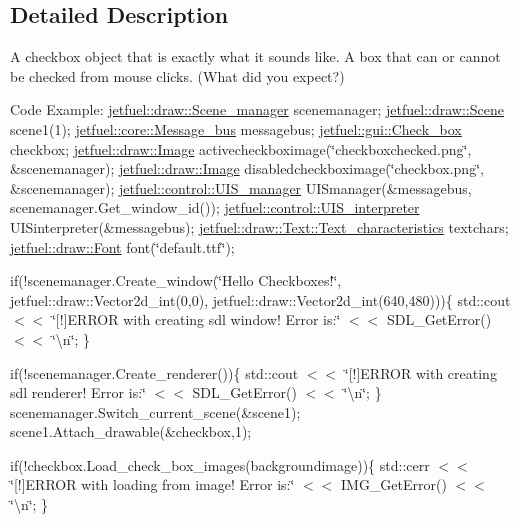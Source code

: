\subsection{Detailed Description}
A checkbox object that is exactly what it sounds like. A box that can or cannot be checked from mouse clicks. (What did you expect?)

Code Example\+: \hyperlink{classjetfuel_1_1draw_1_1Scene__manager}{jetfuel\+::draw\+::\+Scene\+\_\+manager} scenemanager; \hyperlink{classjetfuel_1_1draw_1_1Scene}{jetfuel\+::draw\+::\+Scene} scene1(1); \hyperlink{classjetfuel_1_1core_1_1Message__bus}{jetfuel\+::core\+::\+Message\+\_\+bus} messagebus; \hyperlink{classjetfuel_1_1gui_1_1Check__box}{jetfuel\+::gui\+::\+Check\+\_\+box} checkbox; \hyperlink{classjetfuel_1_1draw_1_1Image}{jetfuel\+::draw\+::\+Image} activecheckboximage(\char`\"{}checkboxchecked.\+png\char`\"{}, \&scenemanager); \hyperlink{classjetfuel_1_1draw_1_1Image}{jetfuel\+::draw\+::\+Image} disabledcheckboximage(\char`\"{}checkbox.\+png\char`\"{}, \&scenemanager); \hyperlink{classjetfuel_1_1control_1_1UIS__manager}{jetfuel\+::control\+::\+U\+I\+S\+\_\+manager} U\+I\+Smanager(\&messagebus, scenemanager.\+Get\+\_\+window\+\_\+id()); \hyperlink{classjetfuel_1_1control_1_1UIS__interpreter}{jetfuel\+::control\+::\+U\+I\+S\+\_\+interpreter} U\+I\+Sinterpreter(\&messagebus); \hyperlink{structjetfuel_1_1draw_1_1Text_1_1Text__characteristics}{jetfuel\+::draw\+::\+Text\+::\+Text\+\_\+characteristics} textchars; \hyperlink{classjetfuel_1_1draw_1_1Font}{jetfuel\+::draw\+::\+Font} font(\char`\"{}default.\+ttf\char`\"{});

if(!scenemanager.Create\+\_\+window(\char`\"{}\+Hello Checkboxes!\char`\"{}, jetfuel\+::draw\+::\+Vector2d\+\_\+int(0,0), jetfuel\+::draw\+::\+Vector2d\+\_\+int(640,480)))\{ std\+::cout $<$$<$ \char`\"{}\mbox{[}!\mbox{]}\+E\+R\+R\+O\+R with creating sdl window! Error is\+:\char`\"{} $<$$<$ S\+D\+L\+\_\+\+Get\+Error() $<$$<$ \char`\"{}\textbackslash{}n\char`\"{}; \}

if(!scenemanager.Create\+\_\+renderer())\{ std\+::cout $<$$<$ \char`\"{}\mbox{[}!\mbox{]}\+E\+R\+R\+O\+R with creating sdl renderer! Error is\+:\char`\"{} $<$$<$ S\+D\+L\+\_\+\+Get\+Error() $<$$<$ \char`\"{}\textbackslash{}n\char`\"{}; \} scenemanager.\+Switch\+\_\+current\+\_\+scene(\&scene1); scene1.\+Attach\+\_\+drawable(\&checkbox,1);

if(!checkbox.Load\+\_\+check\+\_\+box\+\_\+images(backgroundimage))\{ std\+::cerr $<$$<$ \char`\"{}\mbox{[}!\mbox{]}\+E\+R\+R\+O\+R with loading from image! Error is\+:\char`\"{} $<$$<$ I\+M\+G\+\_\+\+Get\+Error() $<$$<$ \char`\"{}\textbackslash{}n\char`\"{}; \}

